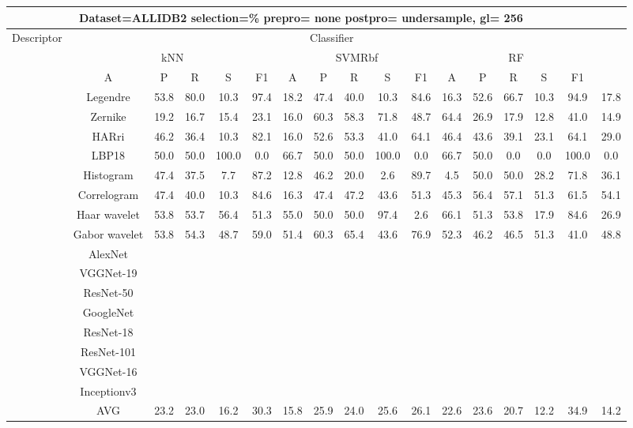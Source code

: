 \documentclass[12pt,italian]{article}
\begin{document}
\begin{tiny}
\begin{longtable}{lcccccccccccccccc}
\toprule
\multicolumn{16}{c}{Dataset=ALLIDB2 selection=\% prepro= none postpro= undersample, gl= 256} \\ 
\toprule
Descriptor & \multicolumn{15}{c}{Classifier} \\ 
& \multicolumn{5}{c}{kNN} & \multicolumn{5}{c}{SVMRbf} & \multicolumn{5}{c}{RF} \\ 
& A & P & R & S & F1 & A & P & R & S & F1 & A & P & R & S & F1 \\ 
\midrule
& Legendre & 53.8 & 80.0 & 10.3 & 97.4 & 18.2 & 47.4 & 40.0 & 10.3 & 84.6 & 16.3 & 52.6 & 66.7 & 10.3 & 94.9 & 17.8 \\ 
& Zernike & 19.2 & 16.7 & 15.4 & 23.1 & 16.0 & 60.3 & 58.3 & 71.8 & 48.7 & 64.4 & 26.9 & 17.9 & 12.8 & 41.0 & 14.9 \\ 
& HARri & 46.2 & 36.4 & 10.3 & 82.1 & 16.0 & 52.6 & 53.3 & 41.0 & 64.1 & 46.4 & 43.6 & 39.1 & 23.1 & 64.1 & 29.0 \\ 
& LBP18 & 50.0 & 50.0 & 100.0 &  0.0 & 66.7 & 50.0 & 50.0 & 100.0 &  0.0 & 66.7 & 50.0 &  0.0 &  0.0 & 100.0 &  0.0 \\ 
& Histogram & 47.4 & 37.5 &  7.7 & 87.2 & 12.8 & 46.2 & 20.0 &  2.6 & 89.7 &  4.5 & 50.0 & 50.0 & 28.2 & 71.8 & 36.1 \\ 
& Correlogram & 47.4 & 40.0 & 10.3 & 84.6 & 16.3 & 47.4 & 47.2 & 43.6 & 51.3 & 45.3 & 56.4 & 57.1 & 51.3 & 61.5 & 54.1 \\ 
& Haar wavelet & 53.8 & 53.7 & 56.4 & 51.3 & 55.0 & 50.0 & 50.0 & 97.4 &  2.6 & 66.1 & 51.3 & 53.8 & 17.9 & 84.6 & 26.9 \\ 
& Gabor wavelet & 53.8 & 54.3 & 48.7 & 59.0 & 51.4 & 60.3 & 65.4 & 43.6 & 76.9 & 52.3 & 46.2 & 46.5 & 51.3 & 41.0 & 48.8 \\ 
& AlexNet \\ 
& VGGNet-19 \\ 
& ResNet-50 \\ 
& GoogleNet \\ 
& ResNet-18 \\ 
& ResNet-101 \\ 
& VGGNet-16 \\ 
& Inceptionv3 \\ 
\hline
& AVG & 23.2 & 23.0 & 16.2 & 30.3 & 15.8 & 25.9 & 24.0 & 25.6 & 26.1 & 22.6 & 23.6 & 20.7 & 12.2 & 34.9 & 14.2 \\ 
\hline
\bottomrule
\end{longtable} 


\end{tiny}
\end{document}
